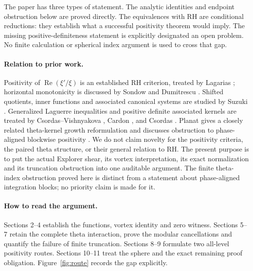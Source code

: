 \documentclass[11pt,letterpaper]{article}
\numberwithin{equation}{section}
\theoremstyle{definition}
\theoremstyle{remark}
\newcommand{\Repart}{\operatorname{Re}}
\begin{document}
The paper has three types of statement. The analytic identities and endpoint obstruction below are proved directly. The equivalences with RH are conditional reductions: they establish what a successful positivity theorem would imply. The missing positive-definiteness statement is explicitly designated an open problem. No finite calculation or spherical index argument is used to cross that gap.

\paragraph{Relation to prior work.}
Positivity of $\Repart(\xi'/\xi)$ is an established RH criterion, treated by Lagarias \cite{lagarias,lagariasCorrection}; horizontal monotonicity is discussed by Sondow and Dumitrescu \cite{sondow}. Shifted quotients, inner functions and associated canonical systems are studied by Suzuki \cite{suzuki}. Generalized Laguerre inequalities and positive definite associated kernels are treated by Csordas--Vishnyakova \cite{cv}, Cardon \cite{cardon}, and Csordas \cite{csordas}. Planat gives a closely related theta-kernel growth reformulation and discusses obstruction to phase-aligned blockwise positivity \cite{planat,planatCompanion}. We do not claim novelty for the positivity criteria, the paired theta structure, or their general relation to RH. The present purpose is to put the actual Explorer shear, its vortex interpretation, its exact normalization and its truncation obstruction into one auditable argument. The finite theta-index obstruction proved here is distinct from a statement about phase-aligned integration blocks; no priority claim is made for it.

\paragraph{How to read the argument.}
Sections 2--4 establish the functions, vortex identity and zero witness. Sections 5--7 retain the complete theta interaction, prove the modular cancellations and quantify the failure of finite truncation. Sections 8--9 formulate two all-level positivity routes. Sections 10--11 treat the sphere and the exact remaining proof obligation. Figure~\ref{fig:route} records the gap explicitly.
\end{document}
